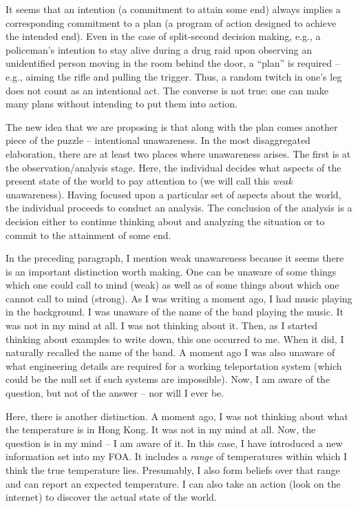 \documentclass[
11pt,
titlepage,
reqno,
]{article}%
\theoremstyle{definition}
\begin{document}
It seems that an intention (a commitment to attain some end) always implies a corresponding commitment to a plan (a program of action designed to achieve the intended end).  Even in the case of split-second decision making, e.g., a policeman's intention to stay alive during a drug raid upon observing an unidentified person moving in the room behind the door, a ``plan'' is required -- e.g., aiming the rifle and pulling the trigger. Thus, a random twitch in one's leg does not count as an intentional act. The converse is not true: one can make many plans without intending to put them into action.

The new idea that we are proposing is that along with the plan comes another piece of the puzzle -- intentional unawareness. In the most disaggregated elaboration, there are at least two places where unawareness arises. The first is at the observation/analysis stage. Here, the individual decides what aspects of the present state of the world to pay attention to (we will call this \textit{weak} unawareness). Having focused upon a particular set of aspects about the world, the individual proceeds to conduct an analysis. The conclusion of the analysis is a decision either to continue thinking about and analyzing the situation or to commit to the attainment of some end. 

In the preceding paragraph, I mention weak unawareness because it seems there is an important distinction worth making. One can be unaware of some things which one could call to mind (weak) as well as of some things about which one cannot call to mind (strong). As I was writing a moment ago, I had music playing in the background. I was unaware of the name of the band playing the music. It was not in my mind at all. I was not thinking about it. Then, as I started thinking about examples to write down, this one occurred to me. When it did, I naturally recalled the name of the band. A moment ago I was also unaware of what engineering details are required for a working teleportation system (which could be the null set if such systems are impossible). Now, I am aware of the question, but not of the answer -- nor will I ever be. 

Here, there is another distinction. A moment ago, I was not thinking about what the temperature is in Hong Kong. It was not in my mind at all. Now, the question is in my mind -- I am aware of it.  In this case, I have introduced a new information set into my FOA. It includes a \textit{range} of temperatures within which I think the true temperature lies. Presumably, I also form beliefs over that range and can report an expected temperature. I can also take an action (look on the internet) to discover the actual state of the world. 
\end{document}
